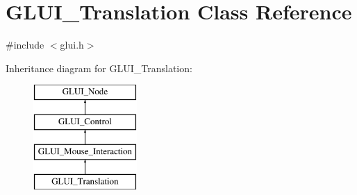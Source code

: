 \hypertarget{classGLUI__Translation}{\section{G\-L\-U\-I\-\_\-\-Translation Class Reference}
\label{classGLUI__Translation}
}


{\ttfamily \#include $<$glui.\-h$>$}

Inheritance diagram for G\-L\-U\-I\-\_\-\-Translation\-:\begin{figure}[H]
\begin{center}
\leavevmode
\includegraphics[height=4.000000cm]{classGLUI__Translation}
\end{center}
\end{figure}

